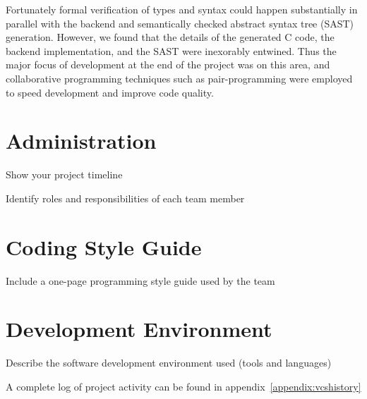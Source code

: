 Fortunately formal verification of types and syntax could happen substantially in parallel
with the backend and semantically checked abstract syntax tree (SAST) generation. However, we found
that the details of the generated C code, the backend implementation, and the SAST were
inexorably entwined. Thus the major focus of development at the end of the project was on
this area, and collaborative programming techniques such as pair-programming were employed to
speed development and improve code quality.


\section{Administration}
Show your project timeline

Identify roles and responsibilities of each team member

\section{Coding Style Guide}
Include a one-page programming style guide used by the team

\section{Development Environment}
Describe the software development environment used (tools and languages)

A complete log of project activity can be found in appendix~\ref{appendix:vcshistory}
